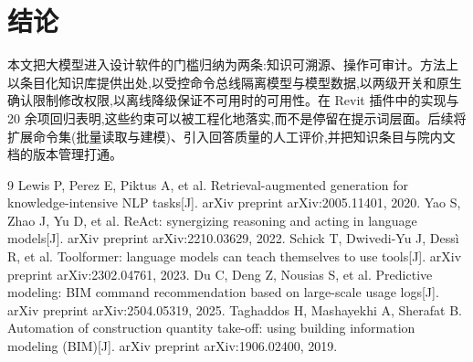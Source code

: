 \documentclass[UTF8,a4paper,zihao=-4]{ctexart}
\begin{document}
\section{结论}

本文把大模型进入设计软件的门槛归纳为两条:知识可溯源、操作可审计。方法上以条目化知识库提供出处,以受控命令总线隔离模型与模型数据,以两级开关和原生确认限制修改权限,以离线降级保证不可用时的可用性。在 Revit 插件中的实现与 20 余项回归表明,这些约束可以被工程化地落实,而不是停留在提示词层面。后续将扩展命令集(批量读取与建模)、引入回答质量的人工评价,并把知识条目与院内文档的版本管理打通。


\begin{thebibliography}{9}
 Lewis P, Perez E, Piktus A, et al. Retrieval-augmented generation for knowledge-intensive NLP tasks[J]. arXiv preprint arXiv:2005.11401, 2020.
 Yao S, Zhao J, Yu D, et al. ReAct: synergizing reasoning and acting in language models[J]. arXiv preprint arXiv:2210.03629, 2022.
 Schick T, Dwivedi-Yu J, Dess\`i R, et al. Toolformer: language models can teach themselves to use tools[J]. arXiv preprint arXiv:2302.04761, 2023.
 Du C, Deng Z, Nousias S, et al. Predictive modeling: BIM command recommendation based on large-scale usage logs[J]. arXiv preprint arXiv:2504.05319, 2025.
 Taghaddos H, Mashayekhi A, Sherafat B. Automation of construction quantity take-off: using building information modeling (BIM)[J]. arXiv preprint arXiv:1906.02400, 2019.
\end{thebibliography}
\end{document}
